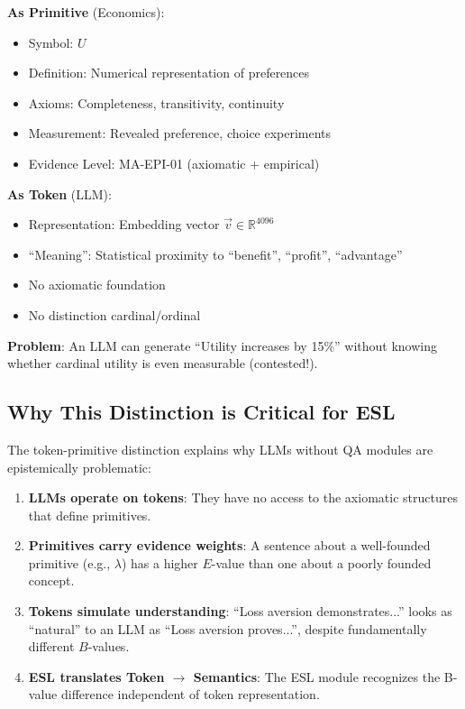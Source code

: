 \documentclass[11pt,a4paper]{article}
\begin{document}
\begin{practicalbox}[title={Example: ``Utility'' as Primitive vs. Token}]
\textbf{As Primitive} (Economics):
\begin{itemize}
    \item Symbol: $U$
    \item Definition: Numerical representation of preferences
    \item Axioms: Completeness, transitivity, continuity
    \item Measurement: Revealed preference, choice experiments
    \item Evidence Level: MA-EPI-01 (axiomatic + empirical)
\end{itemize}

\textbf{As Token} (LLM):
\begin{itemize}
    \item Representation: Embedding vector $\vec{v} \in \mathbb{R}^{4096}$
    \item ``Meaning'': Statistical proximity to ``benefit'', ``profit'', ``advantage''
    \item No axiomatic foundation
    \item No distinction cardinal/ordinal
\end{itemize}

\textbf{Problem}: An LLM can generate ``Utility increases by 15\%'' without knowing whether cardinal utility is even measurable (contested!).
\end{practicalbox}

\subsection{Why This Distinction is Critical for ESL}

The token-primitive distinction explains why LLMs without QA modules are epistemically problematic:

\begin{enumerate}
    \item \textbf{LLMs operate on tokens}: They have no access to the axiomatic structures that define primitives.

    \item \textbf{Primitives carry evidence weights}: A sentence about a well-founded primitive (e.g., $\lambda$) has a higher $E$-value than one about a poorly founded concept.

    \item \textbf{Tokens simulate understanding}: ``Loss aversion demonstrates...'' looks as ``natural'' to an LLM as ``Loss aversion proves...'', despite fundamentally different $B$-values.

    \item \textbf{ESL translates Token $\to$ Semantics}: The ESL module recognizes the B-value difference independent of token representation.
\end{enumerate}
\end{document}
